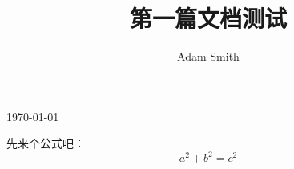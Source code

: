 \documentclass{article}
\begin{document}
    \title{第一篇文档测试}
    \author{Adam Smith}
    
    \maketitle
    
    \today

    先来个公式吧：
    \[
        a^2 + b^2 = c^2
    \]
\end{document}
